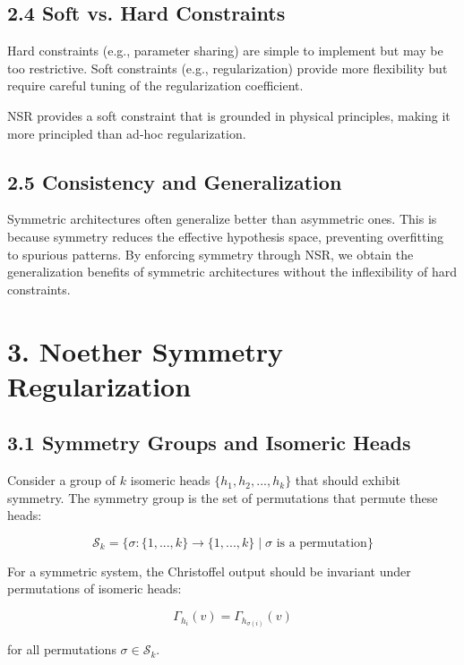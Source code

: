 \documentclass[12pt]{article}
\begin{document}
\subsection{2.4 Soft vs. Hard Constraints}

Hard constraints (e.g., parameter sharing) are simple to implement but may be too restrictive. Soft constraints (e.g., regularization) provide more flexibility but require careful tuning of the regularization coefficient.

NSR provides a soft constraint that is grounded in physical principles, making it more principled than ad-hoc regularization.

\subsection{2.5 Consistency and Generalization}

Symmetric architectures often generalize better than asymmetric ones. This is because symmetry reduces the effective hypothesis space, preventing overfitting to spurious patterns. By enforcing symmetry through NSR, we obtain the generalization benefits of symmetric architectures without the inflexibility of hard constraints.

\section{3. Noether Symmetry Regularization}

\subsection{3.1 Symmetry Groups and Isomeric Heads}

Consider a group of $k$ isomeric heads $\{h_1, h_2, ..., h_k\}$ that should exhibit symmetry. The symmetry group is the set of permutations that permute these heads:

\begin{equation}
\mathcal{S}_k = \{\sigma: \{1, ..., k\} \to \{1, ..., k\} \mid \sigma \text{ is a permutation}\}
\end{equation}

For a symmetric system, the Christoffel output should be invariant under permutations of isomeric heads:

\begin{equation}
\Gamma_{h_i}(v) = \Gamma_{h_{\sigma(i)}}(v)
\end{equation}

for all permutations $\sigma \in \mathcal{S}_k$.
\end{document}
